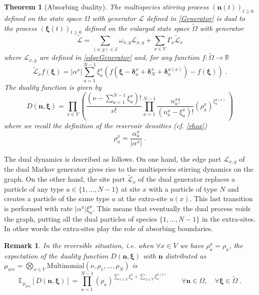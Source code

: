 \documentclass[10pt]{article}
\numberwithin{equation}{section}
\numberwithin{equation}{subsection}
\newtheorem{theorem}{Theorem}
\newtheorem{remark}{Remark}
\newcommand{\dt}{\;.}
\newcommand{\twoj}{\nu}
\newcommand{\fra}[1]{\textcolor[rgb]{0,0,1}{#1}}
\begin{document}
\begin{theorem}[Absorbing duality]\label{thm-duality}
	The multispecies stirring process $(\bm{n}(t))_{t\geq 0}$ defined on the state space $\Omega$ with generator $\mathcal{L}$ defined in \eqref{Generator} is dual to the process $(\bm{\xi}(t))_{t\geq 0}$ defined on the enlarged state space $\widetilde{\Omega}$ with generator
	 \begin{equation}\label{DualGenerator}
		\widetilde{\mathcal{L}}=\sum_{(x,y)\in \mathcal{E}}\omega_{x,y}\mathcal{L}_{x,y}+\sum_{x\in V}\Gamma_{x}\widetilde{\mathcal{L}}_{x}
	\end{equation}
where 
$\mathcal{L}_{x,y}$ \fra{are} defined in \eqref{edgeGenerator} and, for any function $f:\widetilde{\Omega}\to \mathbb{R}$ 
\begin{equation}\label{siteDualGenerator}
	\widetilde{\mathcal{L}}_{x}f(\bm{\xi})=|\alpha^{x}|\sum_{a=1}^{N-1}\xi_{a}^{x}\left(f(\bm{\xi}-\bm{\delta}_{a}^{x}+\bm{\delta}_{N}^{x}+\bm{\delta}_{a}^{u(x)})-f(\bm{\xi})\right)\dt
\end{equation}
The duality function is given by 
\begin{equation}\label{dualityElements}
	D(\bm{n},\bm{\xi})=\prod_{x\in V}\left(\frac{(\nu -\sum_{a=1}^{N-1}\xi_{a}^{x})!}{\nu!}\prod_{a=1}^{N-1}\frac{n_{a}^{x}!}{(n_{a}^{x}-\xi_{a}^{x})!}\left(\rho_{a}^{x}\right)^{\xi_{a}^{u(x)}}\,\right)
\end{equation}
where we recall the definition of the reservoir densities (cf. \eqref{rhox})
\begin{equation}
	\rho_{a}^{x}=\frac{\alpha_{a}^{x}}{|\alpha^{x}|}\dt
\end{equation}
\end{theorem}
The dual dynamics is described as follows. On one hand, the edge part $\mathcal{L}_{x,y}$ of the dual Markov generator gives rise to  the multispecies stirring dynamics on the graph. On the other hand, the site
part $\widetilde{\mathcal{L}}_{x}$ of the dual generator replaces a particle of any type $a\in\{1,\ldots,N-1\}$ at site $x$ with a particle of type $N$ and creates a particle of the same type $a$ at the extra-site $u(x)$. This last transition is performed with rate $|\alpha^{x}|\xi_{a}^{x}$. This means that eventually the dual process voids the graph, putting all the dual particles of species $\{1,\ldots,N-1\}$ in the extra-sites. In other words the extra-sites play the role of absorbing boundaries. 
\begin{remark} In the reversible situation, i.e. when $\forall x\in V$ we have $\rho_{a}^{x}=\rho_{a}$, the expectation  of the duality function  $D(\bm{n},\bm{\xi})$ with   $\bm{n}$ distributed as  $\mu_{\text{rev}} = \bigotimes_{x\in V}\text{Multinomial}\left(\twoj, \rho_{1},\ldots,\rho_{N}\right)$ is
\begin{equation}
\mathbb{E}_{\mu_{\text{rev}}}\left[D(\bm{n},\bm{\xi})\right]=\prod_{a=1}^{N-1}\left(\rho_{a}\right)^{\sum_{x\in V}\xi_{a}^{x}+\sum_{x\in V}\xi_{a}^{u(x)}}\qquad \forall \bm{n}\in \Omega,\quad\forall \bm{\xi}\in \widetilde{\Omega}\dt
\end{equation}
\end{remark}
\end{document}
